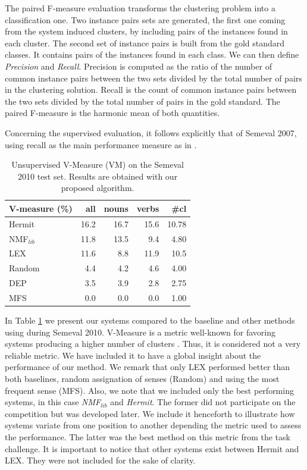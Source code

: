 The paired F-measure evaluation transforms the clustering problem into a classification one. Two instance pairs sets are generated, the first one coming from the system induced clusters, by including pairs of the instances found in each cluster. The second set of instance pairs is built from the gold standard classes. It contains pairs of the instances found in each class. We can then define \textit{Precision} and \textit{Recall}. Precision is computed as the ratio of the number of common instance pairs between the two sets divided by the total number of pairs in the clustering solution. Recall is the count of common instance pairs between the two sets divided by the total number of pairs in the gold standard. The paired F-measure is the harmonic mean of both quantities.

Concerning the supervised evaluation, it follows explicitly that of Semeval 2007, using recall as the main performance measure as in  \cite{Semeval2010,VandeCruys2011,pedersen2010duluth}.

\begin{table}[]
\centering
\caption{Unsupervised V-Measure (VM) on the Semeval 2010 test set. Results are obtained with our proposed algorithm.}
\begin{tabular}{@{}lrrrr@{}}
\toprule
\textbf{V-measure (\%)} & \textbf{all} & \textbf{nouns} & \textbf{verbs} & \textbf{\#cl} \\ \midrule
{Hermit} & 16.2 & 16.7 & 15.6 & 10.78 \\
NMF$_{lib}$&11.8&13.5&9.4&4.80\\
LEX & 11.6 & 8.8 & 11.9 & 10.5 \\
Random & 4.4 & 4.2 & 4.6 & 4.00 \\
DEP & 3.5 & 3.9 & 2.8 & 2.75 \\
MFS & 0.0 & 0.0 & 0.0 & 1.00 \\ \bottomrule
\end{tabular}

\label{tab:sem2010_VM}
\end{table}

In Table \ref{tab:sem2010_VM} we present our systems compared to the baseline and other methods using during Semeval 2010. V-Measure is a metric well-known for favoring systems producing a higher number of clusters \cite{VandeCruys2011,pedersen2010duluth}. Thus, it is considered not a very reliable metric. We have included it to have a global insight about the performance of our method. We remark that only LEX performed better than both baselines, random assignation of senses (Random) and using the most frequent sense (MFS). Also, we note that we included only the best performing systems, in this case \textit{NMF$_{lib}$} and  \textit{Hermit}. The former  did not participate on the competition but was developed later. We include it henceforth to illustrate how systems variate from one position to another depending the metric used to assess the performance. The latter was the best method on this metric from the task challenge. It is important to notice that other systems exist between Hermit and LEX. They were not included for the sake of clarity.

